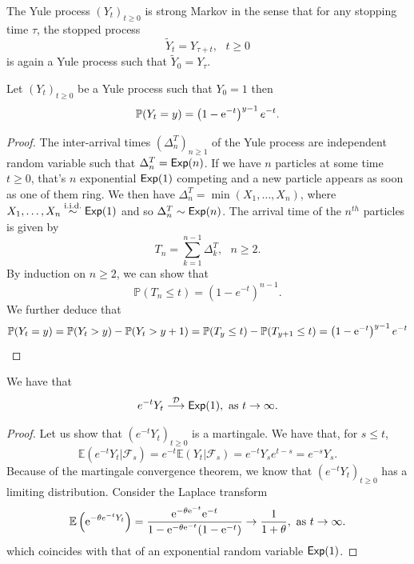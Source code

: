 \begin{remark}\label{rem:stopped_yule_process}
The Yule process $(Y_t)_{t\geq0}$ is strong Markov in the sense that for any stopping time $\tau$, the stopped process 
$$
\tilde{Y}_t = Y_{\tau+t},\text{ }t\geq0
$$
is again a Yule process such that $\tilde{Y}_0 = Y_\tau$.
\end{remark}
\begin{prop}\label{prop:yule_process_dist}
Let $(Y_t)_{t\geq0}$ be a Yule process such that $Y_0 = 1$ then 
$$
\mathbb{P}(Y_t = y) = \left(1-\mathrm{e}^{-t}\right)^{y-1}e^{-t}.
$$

\end{prop}
\begin{proof}
The inter-arrival times $(\Delta^T_n)_{n\geq1}$ of the Yule process are independent random variable such that $\Delta^T_n = \mathsf{Exp}(n)$. If we have $n$ particles at some time $t\geq0$, that's $n$ exponential $\mathsf{Exp}(1)$ competing and a new particle appears as soon as one of them ring. We then have $\Delta^T_n = \min(X_1,\ldots, X_{n})$, where $X_1,\ldots, X_n \overset{\text{i.i.d.}}{\sim}\mathsf{Exp}(1)$ and so $\Delta^T_n \sim \mathsf{Exp}(n)$. The arrival time of the $n^{th}$ particles is given by   
$$
T_n = \sum_{k =1}^{n-1}\Delta^T_k,\text{ }n\geq2.
$$
By induction on $n\geq2$, we can show that 
\[
\mathbb{P}(T_n\leq t) = \left(1-e^{-t}\right)^{n-1}.
\]
We further deduce that 
\[
\mathbb{P}(Y_t = y) = \mathbb{P}(Y_t > y) - \mathbb{P}(Y_t > y+1) = \mathbb{P}(T_{y} \leq t) - \mathbb{P}(T_{y+1} \leq t)=\left(1-\mathrm{e}^{-t}\right)^{y-1}e^{-t}   
\]
\end{proof}
\begin{theo}\label{theo:convergence_yule_process}
We have that 
\[
e^{-t}Y_t\overset{\mathcal{D}}{\longrightarrow}\mathsf{Exp}(1),\text{ as }t\rightarrow \infty.
\]
\end{theo}
\begin{proof}
Let us show that $\left(e^{-t}Y_t\right)_{t\geq0}$ is a martingale. We have that, for $s\leq t$, 
\[
\mathbb{E}(e^{-t}Y_t|\mathcal{F}_s) = e^{-t}\mathbb{E}(Y_t|\mathcal{F}_s) = e^{-t}Y_se^{t-s} = e^{-s}Y_s.
\]
Because of the martingale convergence theorem, we know that $\left(e^{-t}Y_t\right)_{t\geq0}$ has a limiting distribution. Consider the Laplace transform 
\[
\mathbb{E}\left(\mathrm{e}^{-\theta e^{-t}Y_t}\right) = \frac{\mathrm{e}^{-\theta \mathrm{e}^{-t}}\mathrm{e}^{-t} }{1-\mathrm{e}^{-\theta \mathrm{e}^{-t}}(1-\mathrm{e}^{-t})}\rightarrow\frac{1}{1+\theta},\text{ as }t\rightarrow\infty.
\]
which coincides with that of an exponential random variable $\mathsf{Exp}(1)$.

\end{proof}
